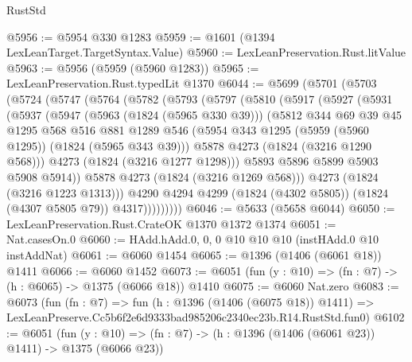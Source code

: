 \begin{lexlean}{RustStd}
\begin{coremodule}
@5956 := @5954 @330 @1283
@5959 := @1601 (@1394 LexLeanTarget.TargetSyntax.Value)
@5960 := LexLeanPreservation.Rust.litValue
@5963 := @5956 (@5959 (@5960 @1283))
@5965 := LexLeanPreservation.Rust.typedLit @1370
@6044 := @5699
    (@5701
      (@5703
        (@5724
          (@5747
            (@5764
              (@5782
                (@5793
                  (@5797
                    (@5810
                      (@5917
                        (@5927
                          (@5931
                            (@5937
                              (@5947
                                (@5963 (@1824 (@5965 @330 @39)))
                                (@5812
                                  @344
                                  @69
                                  @39
                                  @45
                                  @1295
                                  @568
                                  @516
                                  @881
                                  @1289
                                  @546
                                  (@5954 @343 @1295 (@5959 (@5960 @1295)) (@1824 (@5965 @343 @39)))
                                  @5878
                                  @4273
                                  (@1824 (@3216 @1290 @568)))
                                @4273
                                (@1824 (@3216 @1277 @1298)))
                              @5893
                              @5896
                              @5899
                              @5903
                              @5908
                              @5914))
                          @5878
                          @4273
                          (@1824 (@3216 @1269 @568)))
                        @4273
                        (@1824 (@3216 @1223 @1313)))
                      @4290
                      @4294
                      @4299
                      (@1824 (@4302 @5805))
                      (@1824 (@4307 @5805 @79))
                      @4317)))))))))
@6046 := @5633 (@5658 @6044)
@6050 := LexLeanPreservation.Rust.CrateOK @1370 @1372 @1374
@6051 := Nat.casesOn.{0}
@6060 := HAdd.hAdd.{0, 0, 0} @10 @10 @10 (instHAdd.{0} @10 instAddNat)
@6061 := @6060 @1454
@6065 := @1396 (@1406 (@6061 @18)) @1411
@6066 := @6060 @1452
@6073 := @6051 (fun (y : @10) => (fn : @7) -> (h : @6065) -> @1375 (@6066 @18)) @1410
@6075 := @6060 Nat.zero
@6083 := @6073
    (fun (fn : @7) =>
    fun (h : @1396 (@1406 (@6075 @18)) @1411) =>
    LexLeanPreserve.Cc5b6f2e6d9333bad985206c2340ec23b.R14.RustStd.fun0)
@6102 := @6051
    (fun (y : @10) => (fn : @7) -> (h : @1396 (@1406 (@6061 @23)) @1411) -> @1375 (@6066 @23))

\end{coremodule}
\end{lexlean}
